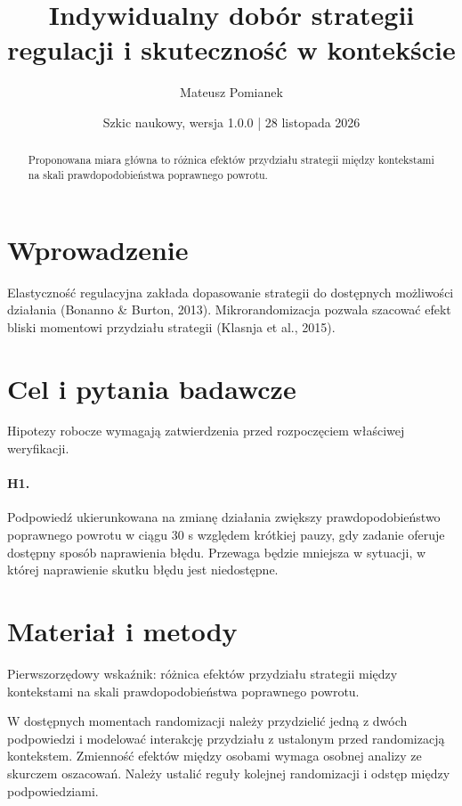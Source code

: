 \documentclass[11pt,a4paper]{article}
\title{Indywidualny dobór strategii regulacji i skuteczność w kontekście}
\author{Mateusz Pomianek}
\date{Szkic naukowy, wersja 1.0.0 | 28 listopada 2026}
\begin{document}
\maketitle

\begin{abstract}

Proponowana miara główna to różnica efektów przydziału strategii między kontekstami na skali prawdopodobieństwa poprawnego powrotu.

\end{abstract}

\section{Wprowadzenie}

Elastyczność regulacyjna zakłada dopasowanie strategii do dostępnych możliwości działania (Bonanno \& Burton, 2013). Mikrorandomizacja pozwala szacować efekt bliski momentowi przydziału strategii (Klasnja et al., 2015).

\section{Cel i pytania badawcze}

Hipotezy robocze wymagają zatwierdzenia przed rozpoczęciem właściwej weryfikacji.

\paragraph{H1.} Podpowiedź ukierunkowana na zmianę działania zwiększy prawdopodobieństwo poprawnego powrotu w ciągu 30 s względem krótkiej pauzy, gdy zadanie oferuje dostępny sposób naprawienia błędu. Przewaga będzie mniejsza w sytuacji, w której naprawienie skutku błędu jest niedostępne.

\section{Materiał i metody}

Pierwszorzędowy wskaźnik: różnica efektów przydziału strategii między kontekstami na skali prawdopodobieństwa poprawnego powrotu.

W dostępnych momentach randomizacji należy przydzielić jedną z dwóch podpowiedzi i modelować interakcję przydziału z ustalonym przed randomizacją kontekstem. Zmienność efektów między osobami wymaga osobnej analizy ze skurczem oszacowań. Należy ustalić reguły kolejnej randomizacji i odstęp między podpowiedziami.
\end{document}
